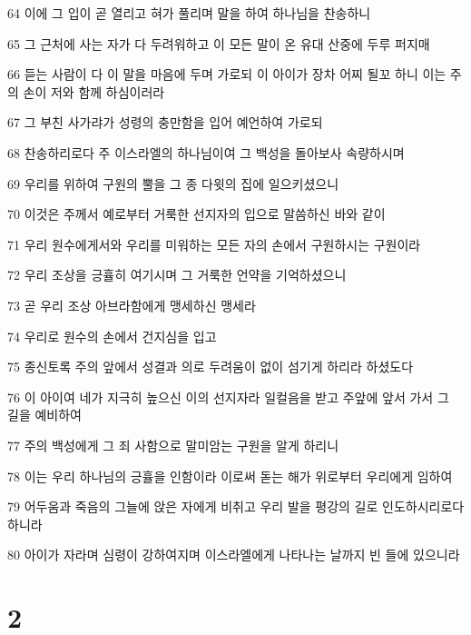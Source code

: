 \par 64 이에 그 입이 곧 열리고 혀가 풀리며 말을 하여 하나님을 찬송하니
\par 65 그 근처에 사는 자가 다 두려워하고 이 모든 말이 온 유대 산중에 두루 퍼지매
\par 66 듣는 사람이 다 이 말을 마음에 두며 가로되 이 아이가 장차 어찌 될꼬 하니 이는 주의 손이 저와 함께 하심이러라
\par 67 그 부친 사가랴가 성령의 충만함을 입어 예언하여 가로되
\par 68 찬송하리로다 주 이스라엘의 하나님이여 그 백성을 돌아보사 속량하시며
\par 69 우리를 위하여 구원의 뿔을 그 종 다윗의 집에 일으키셨으니
\par 70 이것은 주께서 예로부터 거룩한 선지자의 입으로 말씀하신 바와 같이
\par 71 우리 원수에게서와 우리를 미워하는 모든 자의 손에서 구원하시는 구원이라
\par 72 우리 조상을 긍휼히 여기시며 그 거룩한 언약을 기억하셨으니
\par 73 곧 우리 조상 아브라함에게 맹세하신 맹세라
\par 74 우리로 원수의 손에서 건지심을 입고
\par 75 종신토록 주의 앞에서 성결과 의로 두려움이 없이 섬기게 하리라 하셨도다
\par 76 이 아이여 네가 지극히 높으신 이의 선지자라 일컬음을 받고 주앞에 앞서 가서 그 길을 예비하여
\par 77 주의 백성에게 그 죄 사함으로 말미암는 구원을 알게 하리니
\par 78 이는 우리 하나님의 긍휼을 인함이라 이로써 돋는 해가 위로부터 우리에게 임하여
\par 79 어두움과 죽음의 그늘에 앉은 자에게 비취고 우리 발을 평강의 길로 인도하시리로다 하니라
\par 80 아이가 자라며 심령이 강하여지며 이스라엘에게 나타나는 날까지 빈 들에 있으니라

\chapter{2}

